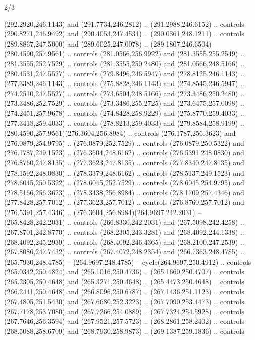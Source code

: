 \begin{flagdescription}{2/3}
\begin{scope}[xshift=0.5\flaglength,yshift=0.5\flagwidth,scale=\flagwidth/235.81]
\begin{scope}[y=0.8pt, x=0.8pt, yscale=-1,shift={(-239.08,-147.38)}]
    (292.2920,246.1143) and (291.7734,246.2812) .. (291.2988,246.6152) .. controls
    (290.8271,246.9492) and (290.4053,247.4531) .. (290.0361,248.1211) .. controls
    (289.8867,247.5000) and (289.6025,247.0078) ..
    (289.1807,246.6504)(280.4590,257.9561) .. controls (281.0566,256.9922) and
    (281.3555,255.2549) .. (281.3555,252.7529) .. controls (281.3555,250.2480) and
    (281.0566,248.5166) .. (280.4531,247.5527) .. controls (279.8496,246.5947) and
    (278.8125,246.1143) .. (277.3389,246.1143) .. controls (275.8828,246.1143) and
    (274.8545,246.5947) .. (274.2510,247.5527) .. controls (273.6504,248.5166) and
    (273.3486,250.2480) .. (273.3486,252.7529) .. controls (273.3486,255.2725) and
    (273.6475,257.0098) .. (274.2451,257.9678) .. controls (274.8428,258.9229) and
    (275.8770,259.4033) .. (277.3418,259.4033) .. controls (278.8213,259.4033) and
    (279.8584,258.9199) .. (280.4590,257.9561)(276.3604,256.8984) .. controls
    (276.1787,256.3623) and (276.0879,254.9795) .. (276.0879,252.7529) .. controls
    (276.0879,250.5322) and (276.1787,249.1523) .. (276.3604,248.6162) .. controls
    (276.5391,248.0830) and (276.8760,247.8135) .. (277.3623,247.8135) .. controls
    (277.8340,247.8135) and (278.1592,248.0830) .. (278.3379,248.6162) .. controls
    (278.5137,249.1523) and (278.6045,250.5322) .. (278.6045,252.7529) .. controls
    (278.6045,254.9795) and (278.5166,256.3623) .. (278.3438,256.8984) .. controls
    (278.1709,257.4346) and (277.8428,257.7012) .. (277.3623,257.7012) .. controls
    (276.8760,257.7012) and (276.5391,257.4346) ..
    (276.3604,256.8984)(264.9697,242.2031) -- (265.8428,242.2031) .. controls
    (266.8330,242.2031) and (267.5098,242.4258) .. (267.8701,242.8770) .. controls
    (268.2305,243.3281) and (268.4092,244.1338) .. (268.4092,245.2939) .. controls
    (268.4092,246.4365) and (268.2100,247.2539) .. (267.8086,247.7432) .. controls
    (267.4072,248.2354) and (266.7363,248.4785) .. (265.7930,248.4785) --
    (264.9697,248.4785) -- cycle(264.9697,250.4912) .. controls
    (265.0342,250.4824) and (265.1016,250.4736) .. (265.1660,250.4707) .. controls
    (265.2305,250.4648) and (265.3271,250.4648) .. (265.4473,250.4648) .. controls
    (266.2441,250.4648) and (266.8096,250.6787) .. (267.1436,251.1123) .. controls
    (267.4805,251.5430) and (267.6680,252.3223) .. (267.7090,253.4473) .. controls
    (267.7178,253.7080) and (267.7266,254.0889) .. (267.7324,254.5928) .. controls
    (267.7646,256.3594) and (267.9521,257.5723) .. (268.2861,258.2402) .. controls
    (268.5088,258.6709) and (268.7930,258.9873) .. (269.1387,259.1836) .. controls

\end{scope}
\end{scope}
\end{flagdescription}
